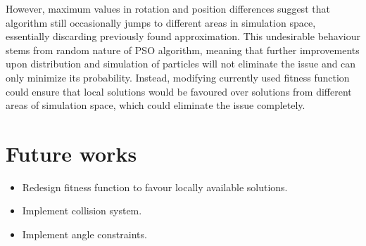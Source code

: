 \documentclass[]{report}
\begin{document}
\noindent However, maximum values in rotation and position differences suggest that algorithm still occasionally jumps to different areas in simulation space, essentially discarding previously found approximation. This undesirable behaviour stems from random nature of PSO algorithm, meaning that further improvements upon distribution and simulation of particles will not eliminate the issue and can only minimize its probability. Instead, modifying currently used fitness function could ensure that local solutions would be favoured over solutions from different areas of simulation space, which could eliminate the issue completely.

\chapter*{Future works}
\begin{itemize}
\item Redesign fitness function to favour locally available solutions.
\item Implement collision system.
\item Implement angle constraints.
\end{itemize}
\end{document}
